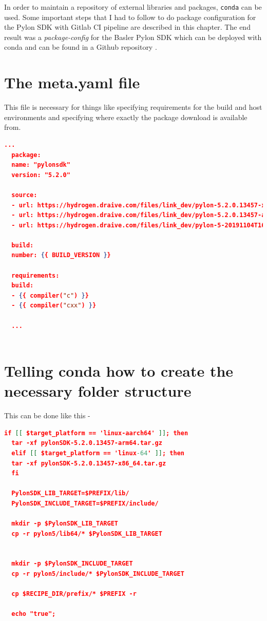 \documentclass[a4paper, 12pt, oneside]{report}
\begin{document}
  In order to maintain a repository of external libraries and packages, \texttt{conda} \cite{CondaCondadocumentation-2019-10-31} can be used. 
  Some important steps that I had to follow to do package configuration for the Pylon SDK \cite{pylonOpenSource-2020-02-14} with Gitlab CI pipeline \cite{CreatingandusingCICDpipelinesGitLab-2020-02-18} are described in this chapter. The end result was a \textit{package-config} \cite{cmakepackages7CMake3170rc1Documentation-2020-02-20} for the Basler Pylon SDK which can be deployed with conda \cite{CondaCondadocumentation-2019-10-31} and can be found in a Github repository \cite{NumericalAdvantagepylonsdkApackageconfigfortheopensourcePylonSDKformBaserAG-2020-02-20}.
  
  \section{The meta.yaml file}
  This file is necessary for things like specifying requirements for the build and host environments and specifying where exactly the package download is available from. 
  
  \begin{lstlisting}[language=json,firstnumber=1]
  ...
  package:
  name: "pylonsdk"
  version: "5.2.0"
  
  source:
  - url: https://hydrogen.draive.com/files/link_dev/pylon-5.2.0.13457-x86_64.tar.gz # [linux and x86_64]
  - url: https://hydrogen.draive.com/files/link_dev/pylon-5.2.0.13457-arm64.tar.gz # [linux and aarch64]
  - url: https://hydrogen.draive.com/files/link_dev/pylon-5-20191104T161031Z-001.zip # [win]
  
  build:
  number: {{ BUILD_VERSION }}
  
  requirements:
  build:
  - {{ compiler("c") }}
  - {{ compiler("cxx") }}
  
  ...
  
  \end{lstlisting} 
  
  \section{Telling conda how to create the necessary folder structure}
  
  This can be done like this - 
  
  \begin{lstlisting}[language=json,firstnumber=1]
  if [[ $target_platform == 'linux-aarch64' ]]; then 
  tar -xf pylonSDK-5.2.0.13457-arm64.tar.gz
  elif [[ $target_platform == 'linux-64' ]]; then 
  tar -xf pylonSDK-5.2.0.13457-x86_64.tar.gz
  fi
  
  PylonSDK_LIB_TARGET=$PREFIX/lib/
  PylonSDK_INCLUDE_TARGET=$PREFIX/include/
  
  mkdir -p $PylonSDK_LIB_TARGET
  cp -r pylon5/lib64/* $PylonSDK_LIB_TARGET
  
  
  mkdir -p $PylonSDK_INCLUDE_TARGET
  cp -r pylon5/include/* $PylonSDK_INCLUDE_TARGET
  
  cp $RECIPE_DIR/prefix/* $PREFIX -r
  
  echo "true";
  \end{lstlisting} 
  
\end{document}
